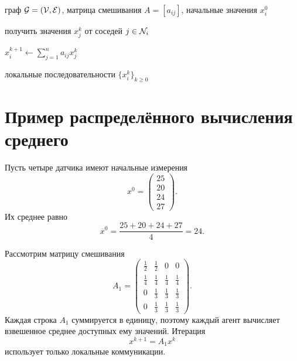 \begin{algorithm}[H]
\caption{Локальный алгоритм консенсуса}
\label{alg:lecture01-consensus}
\begin{algorithmic}[1]

\Require
граф \(\mathcal{G}=(\mathcal{V},\mathcal{E})\),
матрица смешивания \(A=[a_{ij}]\),
начальные значения \(x_i^0\)



        \State
        получить значения \(x_j^k\) от соседей
        \(j\in\mathcal{N}_{i}\)

        \State
        \(x_i^{k+1}
        \gets
        \displaystyle
        \sum_{j=1}^{n}a_{ij}x_j^k\)

    \EndFor

\EndFor

\Ensure
локальные последовательности \(\{x_i^k\}_{k\ge0}\)

\end{algorithmic}
\end{algorithm}

\section{Пример распределённого вычисления среднего}

Пусть четыре датчика имеют начальные измерения
\[
    x^0
    =
    \begin{pmatrix}
        25\\
        20\\
        24\\
        27
    \end{pmatrix}.
\]
Их среднее равно
\[
    \overline{x}^0
    =
    \frac{25+20+24+27}{4}
    =
    24.
\]

Рассмотрим матрицу смешивания
\[
    A_1
    =
    \begin{pmatrix}
        \frac12 & \frac12 & 0 & 0
        \\
        \frac14 & \frac14 & \frac14 & \frac14
        \\
        0 & \frac13 & \frac13 & \frac13
        \\
        0 & \frac13 & \frac13 & \frac13
    \end{pmatrix}.
\]
Каждая строка \(A_1\) суммируется в единицу, поэтому каждый агент
вычисляет взвешенное среднее доступных ему значений. Итерация
\[
    x^{k+1}=A_1x^k
\]
использует только локальные коммуникации.

